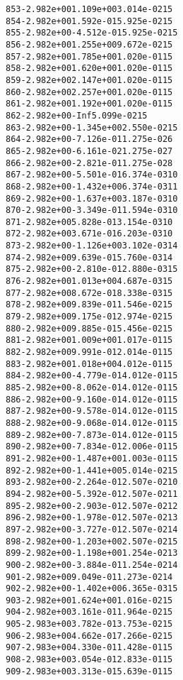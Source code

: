 \begin{alltt}
 853  -2.982e+00   1.109e+00   3.014e-02   15
 854  -2.982e+00   1.592e-01   5.925e-02   15
 855  -2.982e+00  -4.512e-01   5.925e-02   15
 856  -2.982e+00   1.255e+00   9.672e-02   15
 857  -2.982e+00   1.785e+00   1.020e-01   15
 858  -2.982e+00   1.620e+00   1.020e-01   15
 859  -2.982e+00   2.147e+00   1.020e-01   15
 860  -2.982e+00   2.257e+00   1.020e-01   15
 861  -2.982e+00   1.192e+00   1.020e-01   15
 862  -2.982e+00        -Inf   5.099e-02   15
 863  -2.982e+00  -1.345e+00   2.550e-02   15
 864  -2.982e+00  -7.126e-01   1.275e-02    6
 865  -2.982e+00  -6.161e-02   1.275e-02    7
 866  -2.982e+00  -2.821e-01   1.275e-02    8
 867  -2.982e+00  -5.501e-01   6.374e-03   10
 868  -2.982e+00  -1.432e+00   6.374e-03   11
 869  -2.982e+00  -1.637e+00   3.187e-03   10
 870  -2.982e+00  -3.349e-01   1.594e-03   10
 871  -2.982e+00   5.828e-01   3.154e-03   10
 872  -2.982e+00   3.671e-01   6.203e-03   10
 873  -2.982e+00  -1.126e+00   3.102e-03   14
 874  -2.982e+00   9.639e-01   5.760e-03   14
 875  -2.982e+00  -2.810e-01   2.880e-03   15
 876  -2.982e+00   1.013e+00   4.687e-03   15
 877  -2.982e+00   8.672e-01   8.338e-03   15
 878  -2.982e+00   9.839e-01   1.546e-02   15
 879  -2.982e+00   9.175e-01   2.974e-02   15
 880  -2.982e+00   9.885e-01   5.456e-02   15
 881  -2.982e+00   1.009e+00   1.017e-01   15
 882  -2.982e+00   9.991e-01   2.014e-01   15
 883  -2.982e+00   1.018e+00   4.012e-01   15
 884  -2.982e+00  -4.779e-01   4.012e-01   15
 885  -2.982e+00  -8.062e-01   4.012e-01   15
 886  -2.982e+00  -9.160e-01   4.012e-01   15
 887  -2.982e+00  -9.578e-01   4.012e-01   15
 888  -2.982e+00  -9.068e-01   4.012e-01   15
 889  -2.982e+00  -7.873e-01   4.012e-01   15
 890  -2.982e+00  -7.834e-01   2.006e-01   15
 891  -2.982e+00  -1.487e+00   1.003e-01   15
 892  -2.982e+00  -1.441e+00   5.014e-02   15
 893  -2.982e+00  -2.264e-01   2.507e-02   10
 894  -2.982e+00  -5.392e-01   2.507e-02   11
 895  -2.982e+00  -2.903e-01   2.507e-02   12
 896  -2.982e+00  -1.978e-01   2.507e-02   13
 897  -2.982e+00  -3.727e-01   2.507e-02   14
 898  -2.982e+00  -1.203e+00   2.507e-02   15
 899  -2.982e+00  -1.198e+00   1.254e-02   13
 900  -2.982e+00  -3.884e-01   1.254e-02   14
 901  -2.982e+00   9.049e-01   1.273e-02   14
 902  -2.982e+00  -1.402e+00   6.365e-03   15
 903  -2.982e+00   1.624e+00   1.016e-02   15
 904  -2.982e+00   3.161e-01   1.964e-02   15
 905  -2.983e+00   3.782e-01   3.753e-02   15
 906  -2.983e+00   4.662e-01   7.266e-02   15
 907  -2.983e+00   4.330e-01   1.428e-01   15
 908  -2.983e+00   3.054e-01   2.833e-01   15
 909  -2.983e+00   3.313e-01   5.639e-01   15

\end{alltt}

